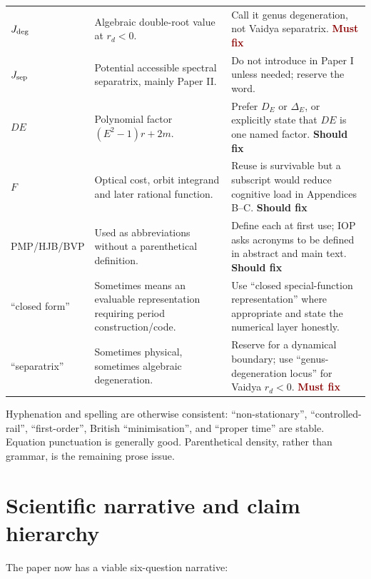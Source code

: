 \documentclass[11pt,a4paper]{article}
\newcommand{\must}{\textcolor{DarkRed}{\textbf{Must fix}}}
\newcommand{\should}{\textcolor{Amber}{\textbf{Should fix}}}
\begin{document}
\begin{longtable}{@{}p{}p{}p{}@{}}
$J_{\rm deg}$ & Algebraic double-root value at $r_d<0$. & Call it genus degeneration, not Vaidya
separatrix. \must \\
$J_{\rm sep}$ & Potential accessible spectral separatrix, mainly Paper II. & Do not introduce in
Paper I unless needed; reserve the word. \\
$DE$ & Polynomial factor $(E^2-1)r+2m$. & Prefer $D_E$ or $\Delta_E$, or explicitly state that
$DE$ is one named factor. \should \\
$F$ & Optical cost, orbit integrand and later rational function. & Reuse is survivable but a subscript
would reduce cognitive load in Appendices B--C. \should \\
PMP/HJB/BVP & Used as abbreviations without a parenthetical definition. & Define each at first use;
IOP asks acronyms to be defined in abstract and main text. \should \\
``closed form'' & Sometimes means an evaluable representation requiring period construction/code. &
Use ``closed special-function representation'' where appropriate and state the numerical layer honestly. \\
``separatrix'' & Sometimes physical, sometimes algebraic degeneration. & Reserve for a dynamical
boundary; use ``genus-degeneration locus'' for Vaidya $r_d<0$. \must \\
\bottomrule
\end{longtable}

Hyphenation and spelling are otherwise consistent: ``non-stationary'', ``controlled-rail'',
``first-order'', British ``minimisation'', and ``proper time'' are stable. Equation punctuation
is generally good. Parenthetical density, rather than grammar, is the remaining prose issue.

\clearpage
\section{Scientific narrative and claim hierarchy}

The paper now has a viable six-question narrative:
\end{document}

